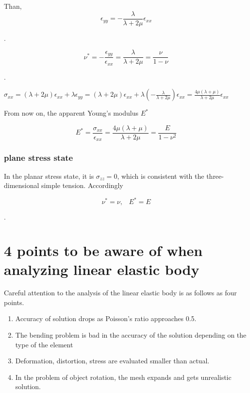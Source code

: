 Than,
\begin{equation}
\epsilon_{yy}=-\frac{\lambda}{\lambda+2\mu}\epsilon_{xx}
\end{equation}

.

\begin{equation}
\nu^*=-\frac{\epsilon_{yy}}{\epsilon_{xx}}=\frac{\lambda}{\lambda+2\mu}=\frac{\nu}{1-\nu}
\end{equation}

.


$\sigma_{xx}=(\lambda+2\mu)\epsilon_{xx}+\lambda\epsilon_{yy}=(\lambda+2\mu)\epsilon_{xx}+\lambda(-\frac{\lambda}{\lambda+2\mu})\epsilon_{xx}=\frac{4\mu(\lambda+\mu)}{\lambda+2\mu}\epsilon_{xx}$


From now on, the apparent Young's modulus $E^*$



\begin{equation}
E^*=\frac{\sigma_{xx}}{\epsilon_{xx}}=\frac{4\mu(\lambda+\mu)}{\lambda+2\mu}=\frac{E}{1-\nu^2}
\end{equation}




\subsubsection{plane stress state}


In the planar stress state, it is $\sigma_{zz}=0$, which is consistent with the three-dimensional simple tension. Accordingly

\begin{equation}
\nu^*=\nu,\;\;\;E^*=E
\end{equation}

.



\section{4 points to be aware of when analyzing linear elastic body}


Careful attention to the analysis of the linear elastic body is as follows as four points.

\begin{enumerate}
\item Accuracy of solution drops as Poisson's ratio approaches 0.5.
\item The bending problem is bad in the accuracy of the solution depending on the type of the element
\item Deformation, distortion, stress are evaluated smaller than actual.
\item In the problem of object rotation, the mesh expands and gets unrealistic solution.
\end{enumerate}

